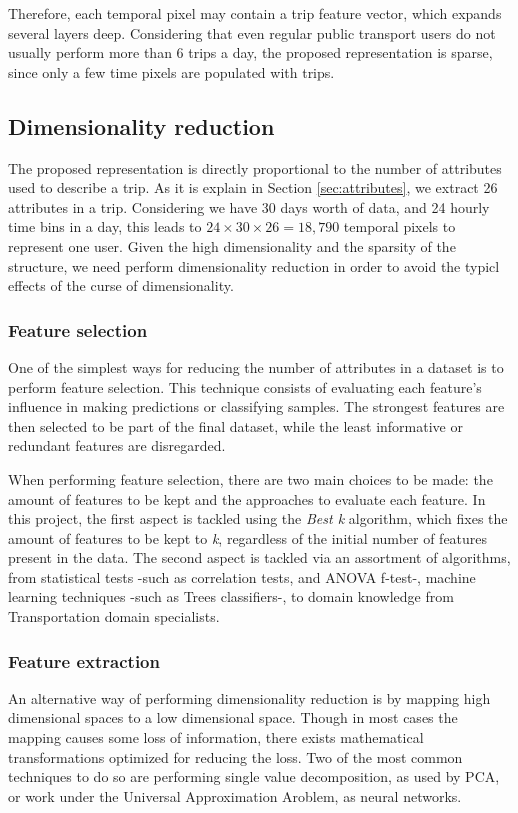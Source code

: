 \documentclass{article}
\begin{document}
Therefore, each temporal pixel may contain a trip feature vector, which expands several layers deep. Considering that even regular public transport users do not usually perform more than 6 trips a day, the proposed representation is sparse, since only a few time pixels are populated with trips.  


\subsection{Dimensionality reduction}
The proposed representation is directly proportional to the number of attributes used to describe a trip. As it is explain in Section \ref{sec:attributes}, we extract 26 attributes in a trip. Considering we have 30 days worth of data, and 24 hourly time bins in a day, this leads to $24 \times 30 \times 26 = 18,790$ temporal pixels to represent one user. Given the high dimensionality and the sparsity of the structure, we need perform dimensionality reduction in order to avoid the typicl effects of the curse of dimensionality. 

\subsubsection{Feature selection}
One of the simplest ways for reducing the number of attributes in a dataset is to perform feature selection. This technique consists of evaluating each feature's influence in making predictions or classifying samples. The strongest features are then selected to be part of the final dataset, while the least informative or redundant features are disregarded. 

When performing feature selection, there are two main choices to be made: the amount of features to be kept and the approaches to evaluate each feature. In this project, the first aspect is tackled using the \textit{Best k} algorithm, which fixes the amount of features to be kept to \textit{k}, regardless of the initial number of features present in the data. The second aspect is tackled via an assortment of algorithms, from statistical tests -such as correlation tests, and ANOVA f-test-, machine learning techniques -such as Trees classifiers-, to domain knowledge from Transportation domain specialists. 

\subsubsection{Feature extraction}
An alternative way of performing dimensionality reduction is by mapping high dimensional spaces to a low dimensional space. Though in most cases the mapping causes some loss of information, there exists mathematical transformations optimized for reducing the loss. Two of the most common techniques to do so are performing single value decomposition, as used by PCA, or work under the Universal Approximation Aroblem, as neural networks. 
\end{document}
